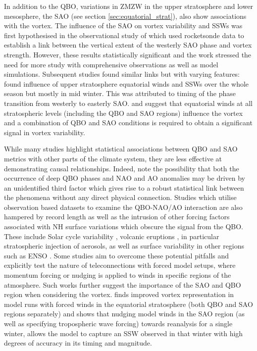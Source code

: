 In addition to the QBO, variations in ZMZW in the upper stratosphere and lower mesosphere, the SAO (see section \ref{sec:equatorial_strat}), also show associations with the vortex. The influence of the SAO on vortex variability and SSWs was first hypothesised in the observational study of \cite{grayData2001} which used rocketsonde data to establish a link between the vertical extent of the westerly SAO phase and vortex strength. However, these results statistically significant and the work stressed the need for more study with comprehensive observations as well as model simulations. Subsequent studies found similar links but with varying features: \cite{grayinfluence2003} found influence of upper stratosphere equatorial winds and SSWs over the whole season but mostly in mid winter. This was attributed to timing of the phase transition from westerly to easterly SAO. \cite{grayData2001} and \cite{hamiltonEffects1998} suggest that equatorial winds at all stratospheric levels (including the QBO and SAO regions) influence the vortex and a combination of QBO and SAO conditions is required to obtain a significant signal in vortex variability.

While many studies highlight statistical associations between QBO and SAO metrics with other parts of the climate system, they are less effective at demonstrating causal relationships. Indeed, \cite{andrewsObserved2019d} note the possibility that both the occurrence of deep QBO phases and NAO and AO anomalies may be driven by an unidentified third factor which gives rise to a robust statistical link between the phenomena without any direct physical connection. Studies which utilise observation based datasets to examine the QBO-NAO/AO interaction are also hampered by record length as well as the intrusion of other forcing factors associated with NH surface variations which obscure the signal from the QBO. These include Solar cycle variability \citep{GrayElevenyear2016}, volcanic eruptions \citep{stenchikovArctic2004}, in particular stratospheric injection of aerosols, as well as surface variability in other regions such as ENSO \citep{bellStratospheric2009}. Some studies aim to overcome these potential pitfalls and explicitly test the nature of teleconnections with forced model setups, where momentum forcing or nudging is applied to winds in specific regions of the atmosphere. Such works further suggest the importance of the SAO and QBO region when considering the vortex. \cite{pascoeQuasibiennial2005b} finds improved vortex representation in model runs with forced winds in the equatorial stratosphere (both QBO and SAO regions separately) and \cite{grayForecasting2020} shows that nudging model winds in the SAO region (as well as specifying tropospheric wave forcing) towards reanalysis for a single winter, allows the model to capture an SSW observed in that winter with high degrees of accuracy in its timing and magnitude.   

